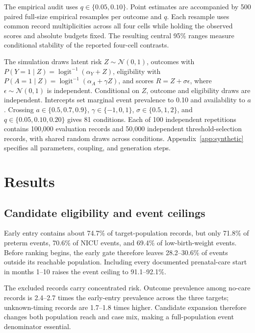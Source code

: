 \documentclass{article}
\begin{document}
The empirical audit uses $q\in\{0.05,0.10\}$. Point estimates are accompanied
by 500 paired full-size empirical resamples per outcome and $q$. Each resample
uses common record multiplicities across all four cells while holding the
observed scores and absolute budgets fixed. The resulting central 95\% ranges
measure conditional stability of the reported four-cell contrasts.

The simulation draws latent risk $Z\sim\mathcal N(0,1)$, outcomes with
$P(Y=1\mid Z)=\operatorname{logit}^{-1}(\alpha_Y+Z)$, eligibility with
$P(A=1\mid Z)=\operatorname{logit}^{-1}(\alpha_A+\gamma Z)$, and scores
$R=Z+\sigma\epsilon$, where $\epsilon\sim\mathcal N(0,1)$ is independent.
Conditional on $Z$, outcome and eligibility draws are independent. Intercepts
set marginal event prevalence to 0.10 and availability to $a$. Crossing
$a\in\{0.5,0.7,0.9\}$, $\gamma\in\{-1,0,1\}$,
$\sigma\in\{0.5,1,2\}$, and $q\in\{0.05,0.10,0.20\}$ gives 81 conditions.
Each of 100 independent repetitions contains 100,000 evaluation records and
50,000 independent threshold-selection records, with shared random draws
across conditions. Appendix~\ref{app:synthetic} specifies all parameters,
coupling, and generation steps.

\section{Results}
\label{sec:results}
\FloatBarrier

\subsection{Candidate eligibility and event ceilings}

Early entry contains about 74.7\% of target-population records, but only 71.8\%
of preterm events, 70.6\% of NICU events, and 69.4\% of low-birth-weight events.
Before ranking begins, the early gate therefore leaves 28.2--30.6\% of events
outside its reachable population. Including every documented prenatal-care
start in months 1--10 raises the event ceiling to 91.1--92.1\%.

The excluded records carry concentrated risk. Outcome prevalence among no-care
records is 2.4--2.7 times the early-entry prevalence across the three targets;
unknown-timing records are 1.7--1.8 times higher. Candidate expansion therefore
changes both population reach and case mix, making a full-population event
denominator essential.


\end{document}
